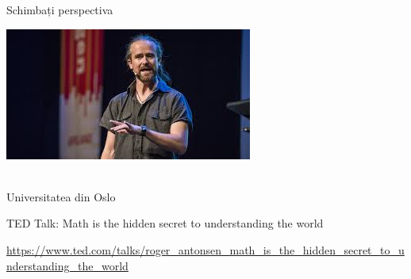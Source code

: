 \documentclass[xcolor=pdftex,romanian,colorlinks]{beamer}
\begin{document}
%
%
%
%

\begin{frame}{Schimbați perspectiva}


\begin{center}

 \includegraphics[scale=.6]{images/antonsen2.jpeg}

 \\
Universitatea din Oslo

\medskip
TED Talk: Math is the hidden secret to understanding the world

\medskip
{}

\medskip
{\footnotesize \url{https://www.ted.com/talks/roger_antonsen_math_is_the_hidden_secret_to_understanding_the_world}}
\end{center}
\end{frame}
\end{document}
